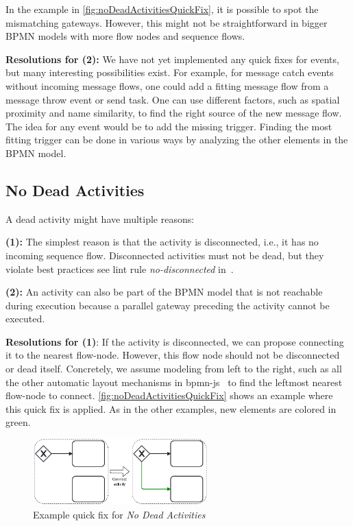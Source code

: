 \documentclass[runningheads]{llncs}
\begin{document}
In the example in \autoref{fig:noDeadActivitiesQuickFix}, it is possible to spot the mismatching gateways.
However, this might not be straightforward in bigger BPMN models with more flow nodes and sequence flows.

\textbf{Resolutions for (2):} We have not yet implemented any quick fixes for events, but many interesting possibilities exist.
For example, for message catch events without incoming message flows, one could add a fitting message flow from a message throw event or send task.
One can use different factors, such as spatial proximity and name similarity, to find the right source of the new message flow.
The idea for any event would be to add the missing trigger.
Finding the most fitting trigger can be done in various ways by analyzing the other elements in the BPMN model.


\subsection{No Dead Activities}
A dead activity might have multiple reasons:

\textbf{(1):} The simplest reason is that the activity is disconnected, i.e., it has no incoming sequence flow.
Disconnected activities must not be dead, but they violate best practices see lint rule \textit{no-disconnected} in~\cite{camundaservicesgmbhBpmnlint2024}.

\textbf{(2):} An activity can also be part of the BPMN model that is not reachable during execution because a parallel gateway preceding the activity cannot be executed.

\textbf{Resolutions for (1)}: If the activity is disconnected, we can propose connecting it to the nearest flow-node.
However, this flow node should not be disconnected or dead itself.
Concretely, we assume modeling from left to the right, such as all the other automatic layout mechanisms in bpmn-js~\cite{camundaservicesgmbhBpmnjs2024} to find the leftmost nearest flow-node to connect.
\autoref{fig:noDeadActivitiesQuickFix} shows an example where this quick fix is applied.
As in the other examples, new elements are colored in green.

\begin{figure}[ht]
	\centering
	\includegraphics[width=0.6\textwidth]{images/dead}
	\caption{Example quick fix for \textit{No Dead Activities}}
	\label{fig:noDeadActivitiesQuickFix}
\end{figure}
\end{document}

